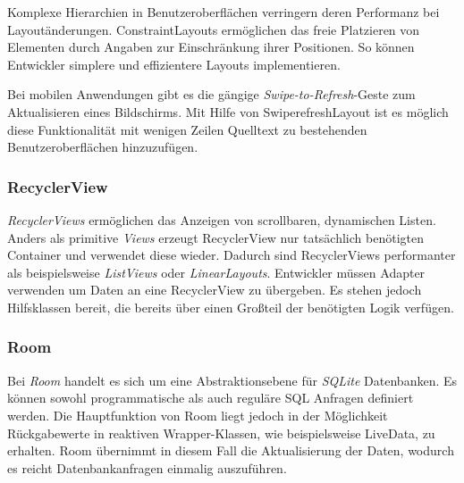 Komplexe Hierarchien in Benutzeroberflächen verringern deren Performanz bei Layoutänderungen.
ConstraintLayouts ermöglichen das freie Platzieren von Elementen durch Angaben zur Einschränkung ihrer Positionen.
So können Entwickler simplere und effizientere Layouts implementieren.

Bei mobilen Anwendungen gibt es die gängige \textit{Swipe-to-Refresh}-Geste zum Aktualisieren eines Bildschirms.
Mit Hilfe von SwiperefreshLayout ist es möglich diese Funktionalität mit wenigen Zeilen Quelltext zu bestehenden Benutzeroberflächen hinzuzufügen.

\subsubsection{RecyclerView}
\label{subsubsec:app:jetpack:recyclerview}
\textit{RecyclerViews} ermöglichen das Anzeigen von scrollbaren, dynamischen Listen.
Anders als primitive \textit{Views} erzeugt RecyclerView nur tatsächlich benötigten Container und verwendet diese wieder.
Dadurch sind RecyclerViews performanter als beispielsweise \textit{ListViews} oder \textit{LinearLayouts}.
Entwickler müssen Adapter verwenden um Daten an eine RecyclerView zu übergeben.
Es stehen jedoch Hilfsklassen bereit, die bereits über einen Großteil der benötigten Logik verfügen.

\subsubsection{Room}
\label{subsubsec:app:jetpack:room}
Bei \textit{Room} handelt es sich um eine Abstraktionsebene für \textit{SQLite} Datenbanken.
Es können sowohl programmatische als auch reguläre SQL Anfragen definiert werden.
Die Hauptfunktion von Room liegt jedoch in der Möglichkeit Rückgabewerte in reaktiven Wrapper-Klassen, wie beispielsweise LiveData, zu erhalten.
Room übernimmt in diesem Fall die Aktualisierung der Daten, wodurch es reicht Datenbankanfragen einmalig auszuführen.

